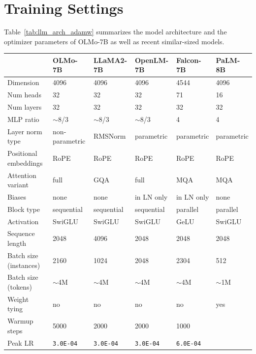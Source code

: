 \documentclass[11pt]{article}
\newcommand{\olmo}{OLMo\xspace}
\begin{document}



\newpage
\appendix

\section{Training Settings}
\label{sec:training_details}
Table~\ref{tab:llm_arch_adamw} summarizes the model architecture and the optimizer parameters of \olmo-7B as well as recent similar-sized models. 

\begin{table}[t]
    \centering
    \small
    \begin{tabular}{l|lllll}
        \toprule
        & \textbf{\olmo-7B} & \textbf{LLaMA2-7B} & \textbf{OpenLM-7B} & \textbf{Falcon-7B} & \textbf{PaLM-8B} \\
        \hline
       Dimension & 4096 & 4096 & 4096 & 4544 & 4096 \\
        Num heads & 32 & 32 & 32 & 71 & 16 \\
        Num layers & 32 & 32 & 32 & 32 & 32 \\
        MLP ratio & $\sim$8/3 & $\sim$8/3 & $\sim$8/3 & 4 & 4 \\
        Layer norm type & non-parametric & RMSNorm & parametric & parametric & parametric \\
        Positional embeddings & RoPE & RoPE & RoPE & RoPE & RoPE \\
        Attention variant & full & GQA & full & MQA & MQA \\
        Biases & none & none & in LN only & in LN only & none \\
        Block type & sequential & sequential & sequential & parallel & parallel \\
        Activation & SwiGLU & SwiGLU & SwiGLU & GeLU & SwiGLU \\
        Sequence length & 2048 & 4096 & 2048 & 2048 & 2048 \\
        Batch size (instances) & 2160 & 1024 & 2048 & 2304 & 512 \\
        Batch size (tokens) & $\sim$4M & $\sim$4M & $\sim$4M & $\sim$4M & $\sim$1M \\
        Weight tying & no & no & no & no & yes \\
        \hline
        Warmup steps & 5000 & 2000 & 2000 & 1000 \\
        Peak LR & \texttt{3.0E-04} & \texttt{3.0E-04} & \texttt{3.0E-04} & \texttt{6.0E-04} \\

\end{tabular}
\end{table}
\end{document}
